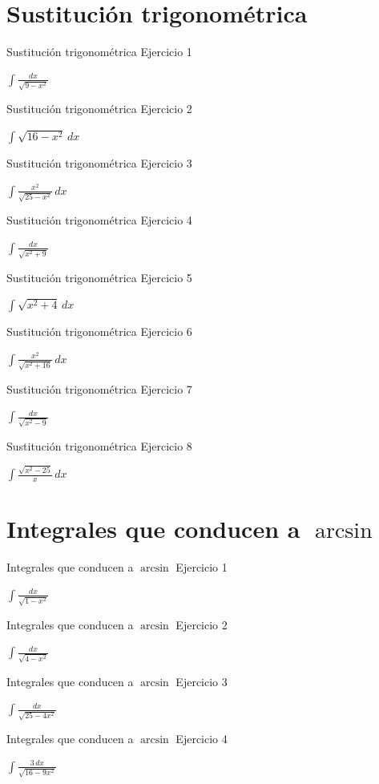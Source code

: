 \documentclass[10pt,aspectratio=169]{beamer}
\newcommand{\ejercicio}[1]{%
  \begin{center}
  \vfill
  {\fontsize{24}{30}\selectfont #1}
  \vfill
  \end{center}
}
\begin{document}
\section{Sustitución trigonométrica}
\begin{frame}{Sustitución trigonométrica}
\small Ejercicio 1
\ejercicio{$\displaystyle \int \frac{dx}{\sqrt{9-x^2}}$}
\end{frame}
\begin{frame}{Sustitución trigonométrica}
\small Ejercicio 2
\ejercicio{$\displaystyle \int \sqrt{16-x^2}\,dx$}
\end{frame}
\begin{frame}{Sustitución trigonométrica}
\small Ejercicio 3
\ejercicio{$\displaystyle \int \frac{x^2}{\sqrt{25-x^2}}\,dx$}
\end{frame}
\begin{frame}{Sustitución trigonométrica}
\small Ejercicio 4
\ejercicio{$\displaystyle \int \frac{dx}{\sqrt{x^2+9}}$}
\end{frame}
\begin{frame}{Sustitución trigonométrica}
\small Ejercicio 5
\ejercicio{$\displaystyle \int \sqrt{x^2+4}\,dx$}
\end{frame}
\begin{frame}{Sustitución trigonométrica}
\small Ejercicio 6
\ejercicio{$\displaystyle \int \frac{x^2}{\sqrt{x^2+16}}\,dx$}
\end{frame}
\begin{frame}{Sustitución trigonométrica}
\small Ejercicio 7
\ejercicio{$\displaystyle \int \frac{dx}{\sqrt{x^2-9}}$}
\end{frame}
\begin{frame}{Sustitución trigonométrica}
\small Ejercicio 8
\ejercicio{$\displaystyle \int \frac{\sqrt{x^2-25}}{x}\,dx$}
\end{frame}

\section{Integrales que conducen a $\arcsin$}
\begin{frame}{Integrales que conducen a $\arcsin$}
\small Ejercicio 1
\ejercicio{$\displaystyle \int \frac{dx}{\sqrt{1-x^2}}$}
\end{frame}
\begin{frame}{Integrales que conducen a $\arcsin$}
\small Ejercicio 2
\ejercicio{$\displaystyle \int \frac{dx}{\sqrt{4-x^2}}$}
\end{frame}
\begin{frame}{Integrales que conducen a $\arcsin$}
\small Ejercicio 3
\ejercicio{$\displaystyle \int \frac{dx}{\sqrt{25-4x^2}}$}
\end{frame}
\begin{frame}{Integrales que conducen a $\arcsin$}
\small Ejercicio 4
\ejercicio{$\displaystyle \int \frac{3\,dx}{\sqrt{16-9x^2}}$}
\end{frame}
\end{document}
